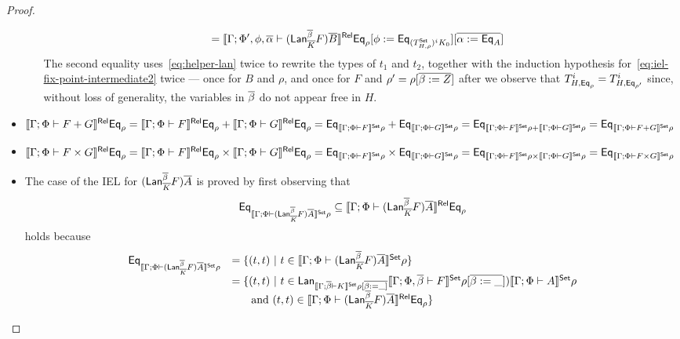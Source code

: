 \documentclass[acmsmall,review,anonymous]{acmart}
\theoremstyle{definition}
\begin{document}
\begin{proof}
\begin{itemize}
\begin{itemize}
{\begin{align*}
  &=\llbracket{\Gamma;\Phi',\phi,\overline{\alpha}
    \vdash (\mathsf{Lan}_{\overline{K}}^{\overline{\beta}} F)\overline{B}}\rrbracket^{\mathsf{Rel}}  \mathsf{Eq}_{\rho} [\phi :=
   \mathsf{Eq}_{(T^{\mathsf{Set}}_{H,\rho})^i
      K_0}] [\overline{\alpha := \mathsf{Eq}_A}]
\end{align*}
The second equality uses~\eqref{eq:helper-lan} twice to rewrite the
types of $t_1$ and $t_2$, together with the induction hypothesis
for~\eqref{eq:iel-fix-point-intermediate2} twice --- once for $B$ and
$\rho$, and once for $F$ and $\rho' = \rho[\overline{\beta := Z}]$ after we
observe that $T^i_{H,\mathsf{Eq}_\rho} = T^i_{H,\mathsf{Eq}_{\rho'}} $ since, without
loss of generality, the variables in $\overline{\beta}$ do not appear free in
$H$.}
\end{itemize}
\item $\llbracket{\Gamma; \Phi \vdash F + G}\rrbracket^{\mathsf{Rel}} \mathsf{Eq}_{\rho} =
  \llbracket{\Gamma; \Phi \vdash F}\rrbracket^{\mathsf{Rel}} \mathsf{Eq}_{\rho} + \llbracket{\Gamma;
    \Phi \vdash G}\rrbracket^{\mathsf{Rel}} \mathsf{Eq}_{\rho} = \mathsf{Eq}_{\llbracket{\Gamma; \Phi \vdash
      F}\rrbracket^{\mathsf{Set}}\rho} + \mathsf{Eq}_{\llbracket{\Gamma; \Phi \vdash G}\rrbracket^{\mathsf{Set}}\rho} =
  \mathsf{Eq}_{\llbracket{\Gamma; \Phi \vdash F}\rrbracket^{\mathsf{Set}}\rho + \llbracket{\Gamma; \Phi
      \vdash G}\rrbracket^{\mathsf{Set}}\rho} = \mathsf{Eq}_{\llbracket{\Gamma; \Phi \vdash F +
      G}\rrbracket^{\mathsf{Set}}\rho}$
\item $\llbracket{\Gamma; \Phi \vdash F \times G}\rrbracket^{\mathsf{Rel}} \mathsf{Eq}_{\rho} =
  \llbracket{\Gamma; \Phi \vdash F}\rrbracket^{\mathsf{Rel}}\mathsf{Eq}_{\rho} \times \llbracket{\Gamma;
    \Phi \vdash G}\rrbracket^{\mathsf{Rel}}\mathsf{Eq}_{\rho} = \mathsf{Eq}_{\llbracket{\Gamma; \Phi \vdash
      F}\rrbracket^{\mathsf{Set}}\rho} \times \mathsf{Eq}_{\llbracket{\Gamma; \Phi \vdash G}\rrbracket^{\mathsf{Set}}\rho}
  = \mathsf{Eq}_{\llbracket{\Gamma; \Phi \vdash F}\rrbracket^{\mathsf{Set}}\rho \times
    \llbracket{\Gamma; \Phi \vdash G}\rrbracket^{\mathsf{Set}}\rho} = \mathsf{Eq}_{\llbracket{\Gamma;
      \Phi \vdash F \times G}\rrbracket^{\mathsf{Set}}\rho}$
\item The case of the IEL for $(\mathsf{Lan}_{\overline{K}}^{\overline{\beta}} F)\overline{A}$ is proved
  by first observing that \[\mathsf{Eq}_{\llbracket{\Gamma; \Phi \vdash
      (\mathsf{Lan}_{\overline{K}}^{\overline{\beta}} F)\overline{A}}\rrbracket^{\mathsf{Set}}\rho} \subseteq
  \llbracket{\Gamma; \Phi \vdash (\mathsf{Lan}_{\overline{K}}^{\overline{\beta}}
    F)\overline{A}}\rrbracket^{\mathsf{Rel}}\mathsf{Eq}_\rho\] holds because
  \[\begin{array}{ll}
\mathsf{Eq}_{\llbracket{\Gamma; \Phi \vdash (\mathsf{Lan}_{\overline{K}}^{\overline{\beta}}
    F)\overline{A}}\rrbracket^{\mathsf{Set}}\rho} &= \{(t,t)~|~t \in \llbracket{\Gamma;\Phi \vdash
  (\mathsf{Lan}_{\overline{K}}^{\overline{\beta}} F)\overline{A}}\rrbracket^{\mathsf{Set}}\rho\}\\
&= \{(t,t)~|~t \in \mathsf{Lan}_{\llbracket{\Gamma;\overline{\beta} \vdash K}\rrbracket^{\mathsf{Set}}\rho[\overline{\beta
    := \_]}} \llbracket{\Gamma;\Phi,\overline{\beta} \vdash F}\rrbracket^{\mathsf{Set}}\rho[\overline{\beta :=
    \_}])\llbracket{\Gamma;\Phi \vdash A}\rrbracket^{\mathsf{Set}}\rho\\
&\hspace*{0.2in}\mbox{ and } (t,t) \in \llbracket{\Gamma;\Phi \vdash
  (\mathsf{Lan}_{\overline{K}}^{\overline{\beta}} F)\overline{A}}\rrbracket^{\mathsf{Rel}}\mathsf{Eq}_\rho\}\\

\end{array}\]
\end{itemize}
\end{proof}
\end{document}
